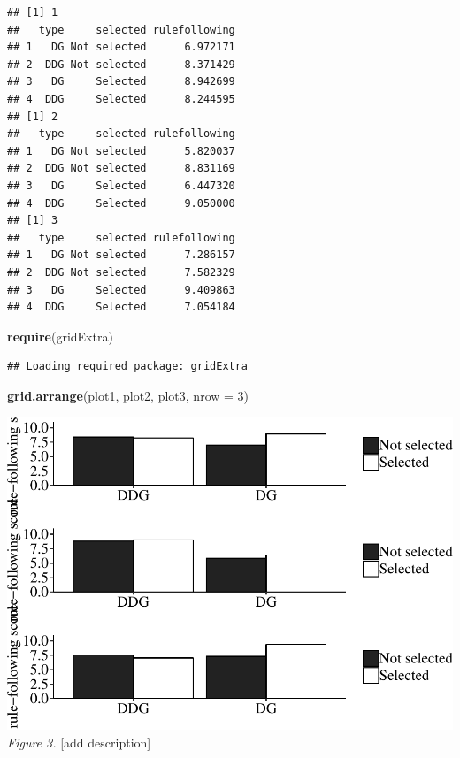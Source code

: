 \documentclass[man]{apa6}
\newenvironment{Shaded}{\begin{snugshade}}{\end{snugshade}}
\newcommand{\DataTypeTok}[1]{\textcolor[rgb]{0.13,0.29,0.53}{#1}}
\newcommand{\DecValTok}[1]{\textcolor[rgb]{0.00,0.00,0.81}{#1}}
\newcommand{\KeywordTok}[1]{\textcolor[rgb]{0.13,0.29,0.53}{\textbf{#1}}}
\newcommand{\NormalTok}[1]{#1}
\begin{document}
\begin{verbatim}
## [1] 1
##   type     selected rulefollowing
## 1   DG Not selected      6.972171
## 2  DDG Not selected      8.371429
## 3   DG     Selected      8.942699
## 4  DDG     Selected      8.244595
## [1] 2
##   type     selected rulefollowing
## 1   DG Not selected      5.820037
## 2  DDG Not selected      8.831169
## 3   DG     Selected      6.447320
## 4  DDG     Selected      9.050000
## [1] 3
##   type     selected rulefollowing
## 1   DG Not selected      7.286157
## 2  DDG Not selected      7.582329
## 3   DG     Selected      9.409863
## 4  DDG     Selected      7.054184
\end{verbatim}

\begin{Shaded}
\begin{Highlighting}[]
\KeywordTok{require}\NormalTok{(gridExtra)}
\end{Highlighting}
\end{Shaded}

\begin{verbatim}
## Loading required package: gridExtra
\end{verbatim}

\begin{Shaded}
\begin{Highlighting}[]
\KeywordTok{grid.arrange}\NormalTok{(plot1, plot2, plot3, }\DataTypeTok{nrow =} \DecValTok{3}\NormalTok{)}
\end{Highlighting}
\end{Shaded}

\includegraphics{Thesis_files/figure-latex/unnamed-chunk-3-1.pdf}
\emph{Figure 3.} {[}add description{]}
\end{document}
